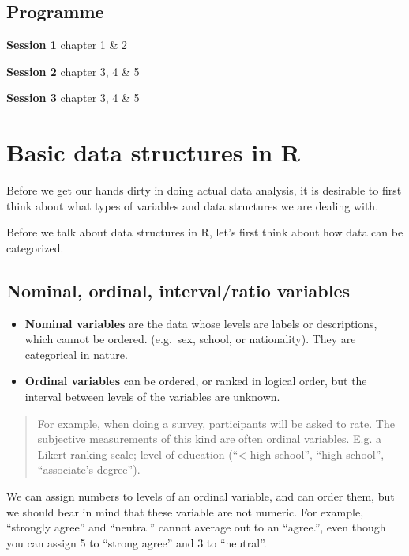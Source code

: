 \documentclass[]{book}
\begin{document}
\section{Programme}\label{programme}

\textbf{Session 1} chapter 1 \& 2

\textbf{Session 2} chapter 3, 4 \& 5

\textbf{Session 3} chapter 3, 4 \& 5

\chapter{Basic data structures in R}\label{intro}

Before we get our hands dirty in doing actual data analysis, it is
desirable to first think about what types of variables and data
structures we are dealing with.

Before we talk about data structures in R, let's first think about how
data can be categorized.

\section{Nominal, ordinal, interval/ratio
variables}\label{nominal-ordinal-intervalratio-variables}

\begin{itemize}
\item
  \textbf{Nominal variables} are the data whose levels are labels or
  descriptions, which cannot be ordered. (e.g.~sex, school, or
  nationality). They are categorical in nature.
\item
  \textbf{Ordinal variables} can be ordered, or ranked in logical order,
  but the interval between levels of the variables are unknown.
\end{itemize}

\begin{quote}
For example, when doing a survey, participants will be asked to rate.
The subjective measurements of this kind are often ordinal variables.
E.g. a Likert ranking scale; level of education (``\textless{} high
school'', ``high school'', ``associate's degree'').
\end{quote}

We can assign numbers to levels of an ordinal variable, and can order
them, but we should bear in mind that these variable are not numeric.
For example, ``strongly agree'' and ``neutral'' cannot average out to an
``agree.'', even though you can assign 5 to ``strong agree'' and 3 to
``neutral''.
\end{document}
